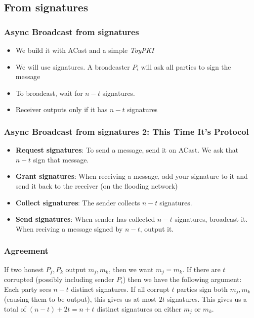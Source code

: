     \subsection{From signatures}
    \begin{frame}
        \frametitle{Async Broadcast from signatures}
            \begin{itemize}
                \item We build it with ACast and a simple \textit{ToyPKI}
                \item We will use signatures. A broadcaster $P_i$ will ask all parties to sign the message
                \item To broadcast, wait for $n-t$ signatures. 
                \item Receiver outputs only if it has $n-t$ signatures
            \end{itemize}                
        \end{frame}
        \begin{frame}
            \frametitle{Async Broadcast from signatures 2: This Time It's Protocol}
                \begin{itemize}
                    \item \textbf{Request signatures}: To send a message, send it on ACast. We ask that $n-t$ sign that message.
                    \item \textbf{Grant signatures}: When receiving a message, add your signature to it and send it back to the receiver (on the flooding network)
                    \item \textbf{Collect signatures}: The sender collects $n-t$ signatures. 
                    \item \textbf{Send signatures}:  When sender has collected $n-t$ signatures, broadcast it. When reciving a message signed by $n-t$, output it. 
                \end{itemize}
        \end{frame}


    \begin{frame}
        \frametitle{Agreement}
            If two honest $P_j, P_k$ output $m_j, m_k$, then we want $m_j = m_k$. If there are $t$ corrupted (possibly including sender $P_i$) then we have the following argument: 
            Each party sees $n - t$ distinct signatures. If all corrupt $t$ parties sign both $m_j, m_k$ (causing them to be output), this gives us at most $2t$ signatures. This gives us a total of $(n -t) + 2t = n+t$ distinct signatures on either $m_j$ or $m_k$. 
    \end{frame}

